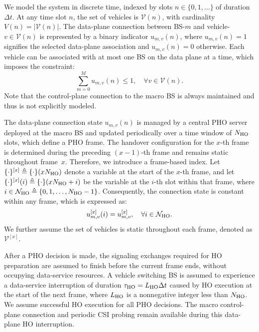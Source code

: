 \documentclass[10pt,journal,letterpaper]{IEEEtran}
\newcommand{\rev}[1]{\textcolor{revisioncolor}{{}#1}}
\newcommand{\omitted}[1]{}
\theoremstyle{remark}
\begin{document}
We model the system in discrete time, indexed by slots $n \in \{0, 1, \dots\}$ of duration $\Delta t$. At any time slot $n$, the set of vehicles is $\mathcal{V}(n)$, with cardinality $V(n) = |\mathcal{V}(n)|$. The {data-plane}
connection between BS-$m$ and vehicle-$v \in \mathcal{V}(n)$ is represented by a binary indicator $u_{m,v}(n)$, where $u_{m,v}(n)=1$ signifies \omitted{}\rev{the selected data-plane association} and $u_{m,v}(n)=0$ otherwise. Each vehicle can be associated with at most one BS on the data plane at a time, which imposes the constraint:
\begin{equation}
    \sum_{m=0}^{M} u_{m,v}(n) \leq 1, \quad \forall v \in \mathcal{V}(n).
    \label{eq:connection_cons}
\end{equation}
Note that the control-plane connection to the macro BS is always maintained and thus is not explicitly modeled.

The data-plane connection state $u_{m,v}(n)$ is managed by a central PHO server deployed at the macro BS and updated periodically over a time window of $N_{\rm HO}$ slots, which define a PHO frame. The handover configuration for the $x$-th frame is determined during the preceding $(x-1)$-th frame and remains static throughout frame~$x$. Therefore, we introduce a frame-based index. Let $\{\cdot\}^{[x]} \triangleq \{\cdot\}(xN_{\rm HO})$ denote a variable at the start of the $x$-th frame, and let $\{\cdot\}^{[x]}(i) \triangleq \{\cdot\}(xN_{\rm HO} + i)$ be the variable at the $i$-th slot within that frame, where $i \in \mathcal{N}_{\rm HO} \triangleq \{0,1,\dots,N_{\rm HO}-1\}$. Consequently, the connection state is constant within any frame, which is expressed as:
    \begin{equation}
        u_{m,v}^{[x]}(i) = u_{m,v}^{[x]}, \quad \forall i \in \mathcal{N}_{\rm HO}.
        \label{eq:PHO_cons}
    \end{equation}
We further assume the set of vehicles is static throughout each frame, denoted as $\mathcal{V}^{[x]}$.

\rev{After a PHO decision is made, the signaling exchanges required for HO preparation are assumed to finish before the current frame ends, without occupying data-service resources. A vehicle switching BS is assumed to experience a data-service interruption of duration $\tau_{\rm HO}=L_{\rm HO}\Delta t$ caused by HO execution at the start of the next frame, where $L_{\rm HO}$ is a nonnegative integer less than $N_{\rm HO}$. We assume successful HO execution for all PHO decisions. The macro control-plane connection and periodic CSI probing remain available during this data-plane HO interruption.}
\end{document}
